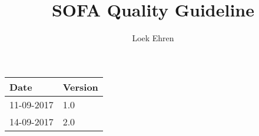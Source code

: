 \documentclass{article}
\begin{document}
	\title{SOFA Quality Guideline}
	\author{Loek Ehren}
	
	\maketitle
	
	\newpage
	
	\begin{table}[htbp]
	\centering
	\begin{tabularx}{\textwidth}{X X}
		\textbf{Date}     & \textbf{Version}   		\\ \hline 										\hline
		11-09-2017         & 1.0             		\\ \hline
		14-09-2017			& 2.0
	\end{tabularx}
\end{table}

	\newpage
	
	\tableofcontents
	
	

	
	
	
	
	
\end{document}
